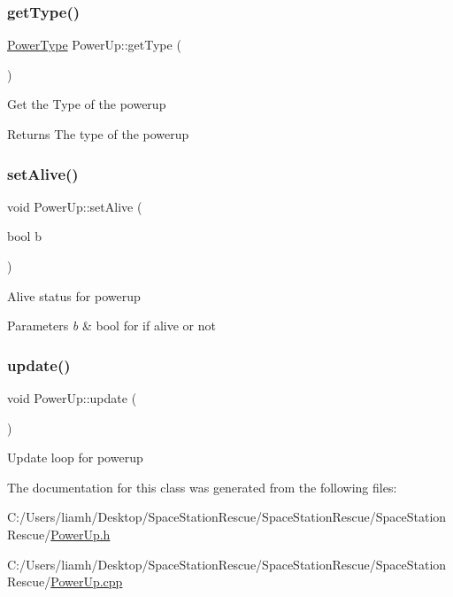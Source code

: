 \subsubsection{\texorpdfstring{getType()}{getType()}}
{\footnotesize\ttfamily \mbox{\hyperlink{_power_up_8h_a0d0e3226055ad5266e487b58fd01cebd}{Power\+Type}} Power\+Up\+::get\+Type (\begin{DoxyParamCaption}{ }\end{DoxyParamCaption})}



Get the Type of the powerup 

\begin{DoxyReturn}{Returns}
The type of the powerup
\end{DoxyReturn}
\mbox{\label{class_power_up_a9cf6bf9fc2727b2ca534b556f2ef062f}} 
\subsubsection{\texorpdfstring{setAlive()}{setAlive()}}
{\footnotesize\ttfamily void Power\+Up\+::set\+Alive (\begin{DoxyParamCaption}\item[{bool}]{b }\end{DoxyParamCaption})}



Alive status for powerup 


\begin{DoxyParams}{Parameters}
{\em b} & bool for if alive or not\\
\hline
\end{DoxyParams}
\mbox{\label{class_power_up_ab96271d08f69d68d022a758836f3c5cd}} 
\subsubsection{\texorpdfstring{update()}{update()}}
{\footnotesize\ttfamily void Power\+Up\+::update (\begin{DoxyParamCaption}{ }\end{DoxyParamCaption})}



Update loop for powerup 



The documentation for this class was generated from the following files\+:\begin{DoxyCompactItemize}
\item 
C\+:/\+Users/liamh/\+Desktop/\+Space\+Station\+Rescue/\+Space\+Station\+Rescue/\+Space\+Station\+Rescue/\mbox{\hyperlink{_power_up_8h}{Power\+Up.\+h}}\item 
C\+:/\+Users/liamh/\+Desktop/\+Space\+Station\+Rescue/\+Space\+Station\+Rescue/\+Space\+Station\+Rescue/\mbox{\hyperlink{_power_up_8cpp}{Power\+Up.\+cpp}}\end{DoxyCompactItemize}
